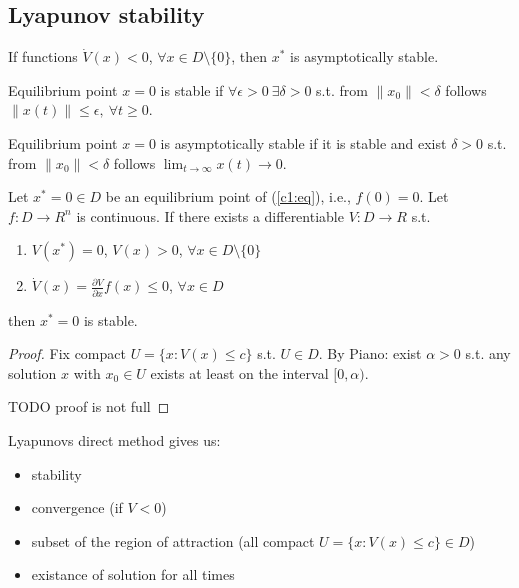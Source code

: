 \subsection{Lyapunov stability}

If functions $\dot V(x) < 0$, $\forall x \in D \setminus \{0\}$, then $x^*$ is
asymptotically stable.

\begin{Definition}
Equilibrium point $x=0$ is stable if $\forall \epsilon > 0\ \exists \delta > 0$
s.t. from $\|x_0\| < \delta$ follows $\|x(t)\| \le \epsilon, \ \forall t \ge 0$.
\end{Definition}

\begin{Definition}
Equilibrium point $x=0$ is asymptotically stable if it is stable and exist $\delta>0$
s.t. from $\|x_0\|<\delta$ follows 
$\lim_{t\rightarrow \infty}x(t) \rightarrow 0$.
\end{Definition}


\begin{Theorem}
Let $x^*=0 \in D$ be an equilibrium point of (\ref{c1:eq}), i.e., $f(0)=0.$ Let
$f: D \rightarrow R^n$ is continuous. If there exists a differentiable 
$V:D\rightarrow R$ s.t. 
\begin{enumerate}
\item $V(x^*)=0$, $V(x)>0$, $\forall x \in D \setminus \{0\}$
\item $\dot V(x) = \frac{\partial V}{\partial x}f(x) \le 0$, $\forall x \in D$
\end{enumerate}

then $x^*=0$ is stable.

\begin{proof}
 Fix compact $U=\{x:V(x)\le c\}$ s.t. $U\in D$. By Piano: exist $\alpha > 0$
s.t. any solution $x$ with $x_0 \in U$ exists at least on the interval
$[0,\alpha)$.

TODO proof is not full
\end{proof}
\end{Theorem}

Lyapunovs direct method gives us:
\begin{itemize}
 \item stability
 \item convergence (if $V<0$)
 \item subset of the region of attraction (all compact $U=\{x:V(x)\le c\} \in D$)
 \item existance of solution for all times
\end{itemize}





 

